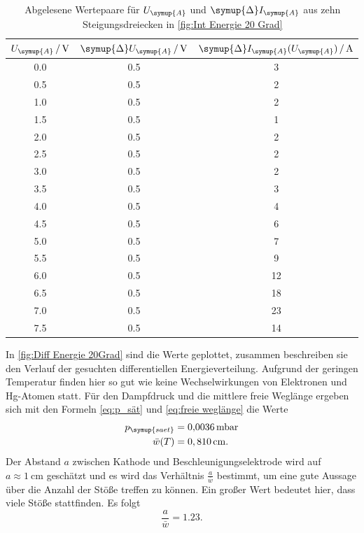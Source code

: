 \begin{table}[H]
  \centering
  \caption{Abgelesene Wertepaare für $U_{\symup{A}}$ und $\symup{\Delta}I_{\symup{A}}$ aus zehn Steigungsdreiecken in \autoref{fig:Int Energie 20 Grad}}
  \label{tab:Diff Energie 20 Grad}
  \begin{tabular}{S[table-format=1.1] S[table-format=1.1] S[table-format=2.0]}
      \toprule
       {$U_{\symup{A}}\,/\,\unit{\volt}$} & {$\symup{\Delta}U_{\symup{A}}\,/\,\unit{\volt}$} & {$\symup{\Delta}I_{\symup{A}}(U_{\symup{A}})\,/\,\unit{\ampere}$} \\
       & 0.5 &	3 \\
      0.5 & 0.5 &	2 \\
      1.0 & 0.5 &	2 \\
      1.5 & 0.5 &	1 \\
      2.0 & 0.5 &	2 \\
      2.5 & 0.5 &	2 \\
      3.0 & 0.5 &	2 \\
      3.5 & 0.5 &	3 \\
      4.0 & 0.5 &	4 \\
      4.5 & 0.5 &	6 \\
      5.0 & 0.5 &	7 \\
      5.5 & 0.5 &	9 \\
      6.0 & 0.5 &	12 \\
      6.5 & 0.5 &	18 \\
      7.0 & 0.5 &	23 \\
      7.5 & 0.5 &	14 \\
      \bottomrule 
  \end{tabular}
\end{table}

In \autoref{fig:Diff Energie 20Grad} sind die Werte geplottet, zusammen beschreiben sie den Verlauf der gesuchten differentiellen
Energieverteilung.
Aufgrund der geringen Temperatur finden hier so gut wie keine Wechselwirkungen von Elektronen und Hg-Atomen statt.
Für den Dampfdruck und die mittlere freie Weglänge ergeben sich mit den Formeln \eqref{eq:p_sät} und \eqref{eq:freie weglänge} die Werte
\begin{align*}
  p_{\symup{saet}} &= \qty{0.0036}{\milli\bar} \\
  \bar{w}(T) &= 0,810\,\unit{\centi\meter}.
\end{align*}
Der Abstand $a$ zwischen Kathode und Beschleunigungselektrode wird auf $a\approx\qty{1}{\centi\metre}$ geschätzt und es wird das
Verhältnis $\frac{a}{\bar{w}}$ bestimmt, um eine gute Aussage über die Anzahl der Stöße treffen zu können. Ein großer Wert bedeutet hier, dass
viele Stöße stattfinden. Es folgt
\begin{equation*}
  \frac{a}{\bar{w}} = \num{1,23}.
\end{equation*}

